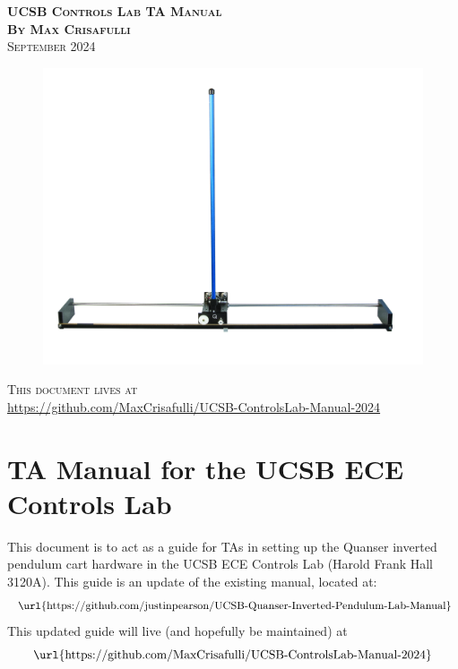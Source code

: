 \documentclass[11pt,letterpaper]{article}
\begin{document}
\begin{center}
  \Huge{\textsc{\textbf{UCSB Controls Lab TA Manual}}}
  \vspace{0.5cm}
  \\ \textbf{\textsc{By} \large{\textsc{Max Crisafulli}}}
  \vspace{0.2cm}
  \\ \textsc{September 2024}

  \vspace{\fill}

\begin{figure}[H]
    \centering
    \includegraphics[width=1\textwidth]{./Figures/IP02-Inverted-Pendulum_graphics.jpg}
\end{figure}

\vspace{\fill}


\textsc{This document lives at} \\
\url{https://github.com/MaxCrisafulli/UCSB-ControlsLab-Manual-2024}
\end{center}
\thispagestyle{empty}

\newpage
\phantom{}
\thispagestyle{empty}
\newpage
\setcounter{page}{1}


\section*{TA Manual for the UCSB ECE Controls Lab}
This document is to act as a guide for TAs in setting up the Quanser inverted pendulum cart hardware in the UCSB ECE Controls Lab (Harold Frank Hall 3120A). This guide is an update of the existing manual, located at:
\[ \text{ \url{https://github.com/justinpearson/UCSB-Quanser-Inverted-Pendulum-Lab-Manual}}\]
This updated guide will live (and hopefully be maintained) at 
\[\text{\url{https://github.com/MaxCrisafulli/UCSB-ControlsLab-Manual-2024}}\]
\end{document}

